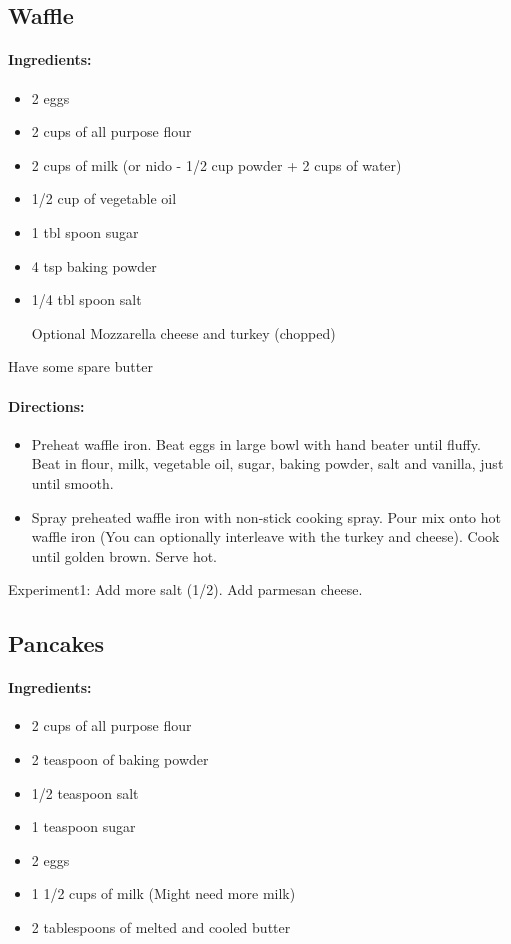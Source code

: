 \documentclass{article}
\begin{document}
\subsection{Waffle}

\paragraph{Ingredients:}

\begin{itemize}
	\item 2 eggs
	\item 2 cups of all purpose flour
	\item 2 cups of milk (or nido - 1/2 cup powder + 2 cups of water)
	\item 1/2 cup of vegetable oil
	\item 1 tbl spoon sugar
	\item 4 tsp baking powder
	\item 1/4 tbl spoon salt
	\item [Optional] Mozzarella cheese and turkey (chopped)
\end{itemize}

Have some spare butter

\paragraph{Directions:}
\begin{itemize}
	\item Preheat waffle iron. Beat eggs in large bowl with hand beater until fluffy. Beat in flour, milk, vegetable oil, sugar, baking powder, salt and vanilla, just until smooth.
	\item Spray preheated waffle iron with non-stick cooking spray. Pour mix onto hot waffle iron (You can optionally interleave with the turkey and cheese). Cook until golden brown. Serve hot.
\end{itemize}

Experiment1: Add more salt (1/2). Add parmesan cheese.

\subsection{Pancakes}

\paragraph{Ingredients:}

\begin{itemize}
	\item 2 cups of all purpose flour 
	\item 2 teaspoon of baking powder 
	\item 1/2 teaspoon salt 
	\item 1 teaspoon sugar 
	\item 2 eggs 
	\item 1 1/2 cups of milk (Might need more milk)
	\item 2 tablespoons of melted and cooled butter
\end{itemize}
\end{document}

